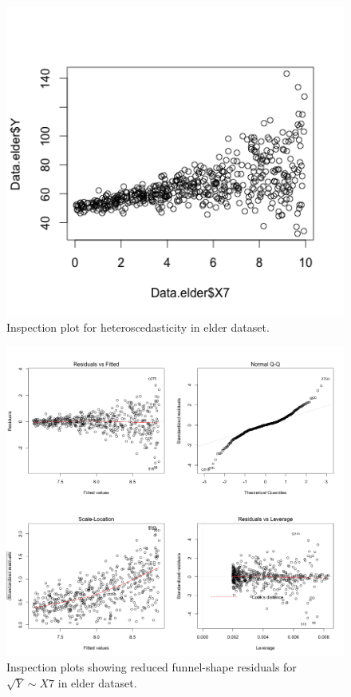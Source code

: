 \documentclass{article}
\begin{document}
\begin{figure}[h!]
  \includegraphics[width=\linewidth]{project/images/03-elder.png}
  \caption{Inspection plot for heteroscedasticity in elder dataset.}
  \label{fig:03-elder}
\end{figure}

\begin{figure}[h!]
  \includegraphics[width=\linewidth]{project/images/04-elder.png}
  \caption{Inspection plots showing reduced funnel-shape residuals for $\sqrt{Y} \sim X7$ in elder dataset.}
  \label{fig:04-elder}
\end{figure}
\end{document}
